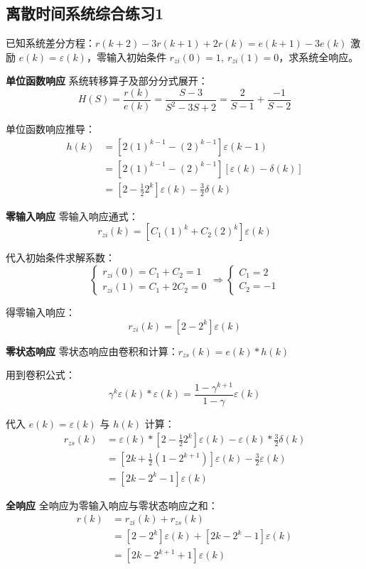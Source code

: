 \documentclass[UTF8]{ctexart}
\begin{document}
\subsection{离散时间系统综合练习1}

\begin{problem}
已知系统差分方程：$r(k+2)-3 r(k+1)+2 r(k)=e(k+1)-3 e(k)$
激励 $e(k)=\varepsilon(k)$，零输入初始条件 $r_{zi}(0)=1,\ r_{zi}(1)=0$，求系统全响应。
\end{problem}

\begin{solution}
\textbf{单位函数响应}
系统转移算子及部分分式展开：
$$
H(S)=\frac{r(k)}{e(k)}=\frac{S-3}{S^{2}-3 S+2}=\frac{2}{S-1}+\frac{-1}{S-2}
$$

单位函数响应推导：
$$
\begin{aligned}
h(k) & =\left[2(1)^{k-1}-(2)^{k-1}\right] \varepsilon(k-1) \\
& =\left[2(1)^{k-1}-(2)^{k-1}\right][\varepsilon(k)-\delta(k)] \\
& =\left[2-\frac{1}{2} 2^{k}\right] \varepsilon(k)-\frac{3}{2} \delta(k)
\end{aligned}
$$

\textbf{零输入响应}
零输入响应通式：
$$r_{zi}(k)=\left[C_{1}(1)^{k}+C_{2}(2)^{k}\right] \varepsilon(k)$$

代入初始条件求解系数：
$$
\left\{
\begin{array}{c}
r_{zi}(0)=C_{1}+C_{2}=1 \\
r_{zi}(1)=C_{1}+2 C_{2}=0
\end{array}
\right.
\Rightarrow
\left\{
\begin{array}{c}
C_{1}=2 \\
C_{2}=-1
\end{array}
\right.
$$

得零输入响应：
$$
r_{zi}(k)=\left[2-2^{k}\right] \varepsilon(k)
$$

\textbf{零状态响应}
零状态响应由卷积和计算：$r_{zs}(k)=e(k) * h(k)$

用到卷积公式：
$$
\gamma^{k} \varepsilon(k) * \varepsilon(k)=\frac{1-\gamma^{k+1}}{1-\gamma} \varepsilon(k)
$$

代入 $e(k)=\varepsilon(k)$ 与 $h(k)$ 计算：
$$
\begin{aligned}
r_{zs}(k) & =\varepsilon(k) *\left[2-\frac{1}{2} 2^{k}\right] \varepsilon(k)-\varepsilon(k) * \frac{3}{2} \delta(k) \\
& =\left[2 k+\frac{1}{2}\left(1-2^{k+1}\right)\right] \varepsilon(k)-\frac{3}{2} \varepsilon(k) \\
& =\left[2 k-2^{k}-1\right] \varepsilon(k)
\end{aligned}
$$

\textbf{全响应}
全响应为零输入响应与零状态响应之和：
$$
\begin{aligned}
r(k) & =r_{zi}(k)+r_{zs}(k) \\
& =\left[2-2^{k}\right] \varepsilon(k)+\left[2 k-2^{k}-1\right] \varepsilon(k) \\
& =\left[2 k-2^{k+1}+1\right] \varepsilon(k)
\end{aligned}
$$
\end{solution}
\end{document}
